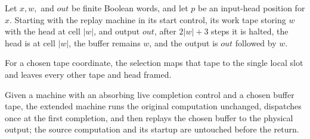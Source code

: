\begin{lemma}
\label{Complexity.clReplay_run}
\leanok
{}
Let $x,w,$ and $out$ be finite Boolean words, and let $p$ be an input-head position for
$x$. Starting with the replay machine in its start control, its work tape storing $w$
with the head at cell $|w|$, and output $out$, after $2|w|+3$ steps it is halted, the
head is at cell $|w|$, the buffer remains $w$, and the output is $out$ followed by $w$.
\end{lemma}

\begin{definition}
\label{Complexity.clOneSelect}
\leanok
{}
For a chosen tape coordinate, the selection maps that tape to the single local slot and leaves every other tape and head framed.
\end{definition}

\begin{definition}
\label{Complexity.clOutputTM}
\leanok
{}
Given a machine with an absorbing live completion control and a chosen buffer tape, the extended machine runs the original computation unchanged, dispatches once at the first completion, and then replays the chosen buffer to the physical output; the source computation and its startup are untouched before the return.
\end{definition}

